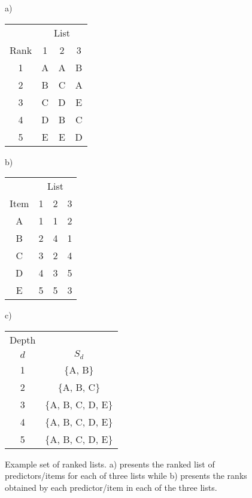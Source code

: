 \documentclass[12pt,a4paper]{article}\usepackage[]{graphicx}\usepackage[]{color}
\begin{document}
\begin{figure}[tb]

\begin{center}
\begin{minipage}{4cm}
a)
\begin{tabular}{cccc} \hline\hline
  & \multicolumn{3}{c}{List} \\
Rank  & 1 & 2 & 3 \\ \hline
1 & A & A & B \\
2 & B & C & A \\
3 & C & D & E \\
4 & D & B & C \\
5 & E & E & D \\ \hline
\end{tabular}
\end{minipage}
\begin{minipage}{4cm}b)
\begin{tabular}{cccc} \hline\hline
  & \multicolumn{3}{c}{List} \\
Item  & 1 & 2 & 3 \\ \hline
A & 1 & 1 & 2 \\
B & 2 & 4 & 1 \\
C & 3 & 2 & 4 \\
D & 4 & 3 & 5 \\
E & 5 & 5 & 3 \\ \hline
\end{tabular}
\end{minipage}
\begin{minipage}{4cm}c)
\begin{tabular}{cc} \hline\hline
Depth   &     \\
$d$  &  $S_d$ \\ \hline
1 & $\{$A, B$\}$\\
2 & $\{$A, B, C$\}$ \\
3 & $\{$A, B, C, D, E$\}$ \\
4 & $\{$A, B, C, D, E$\}$ \\
5 & $\{$A, B, C, D, E$\}$ \\ \hline
\end{tabular}
\end{minipage}
\end{center}
\caption{Example set of ranked lists. a) presents the ranked list of predictors/items for each of three lists while b) presents the ranks obtained by each predictor/item in each of the three lists.}
\label{fig:example}
\end{figure}
\end{document}
